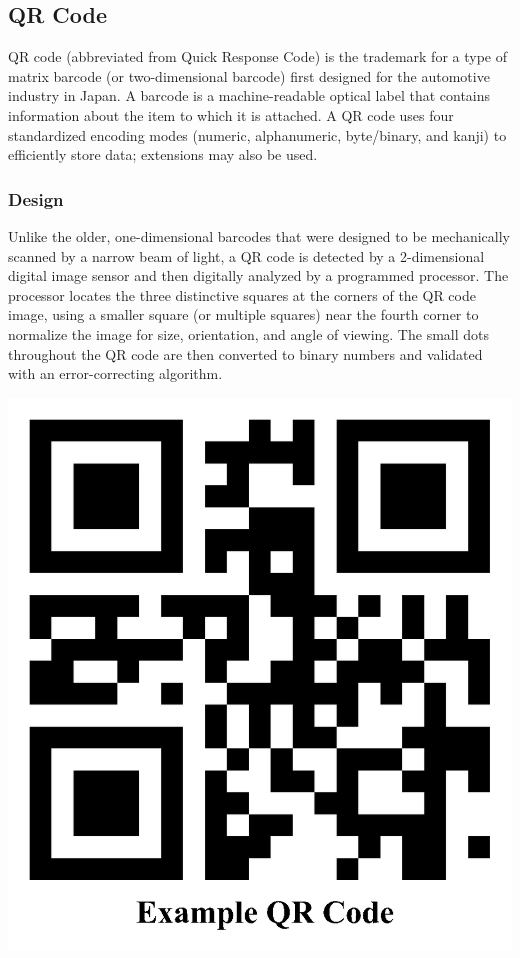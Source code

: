 \documentclass[12pt,journal,compsoc]{IEEEtran}
\begin{document}
\subsection{QR Code}
QR code (abbreviated from Quick Response Code) is the trademark for a type of matrix barcode (or two-dimensional barcode) first designed for the automotive industry in Japan. A barcode is a machine-readable optical label that contains information about the item to which it is attached. A QR code uses four standardized encoding modes (numeric, alphanumeric, byte/binary, and kanji) to efficiently store data; extensions may also be used.


\subsubsection{Design}

Unlike the older, one-dimensional barcodes that were designed to be mechanically scanned by a narrow beam of light, a QR code is detected by a 2-dimensional digital image sensor and then digitally analyzed by a programmed processor. The processor locates the three distinctive squares at the corners of the QR code image, using a smaller square (or multiple squares) near the fourth corner to normalize the image for size, orientation, and angle of viewing. The small dots throughout the QR code are then converted to binary numbers and validated with an error-correcting algorithm.

\begin{center}
\includegraphics[scale=0.2]{qrcode}
\end{center}
\end{document}
